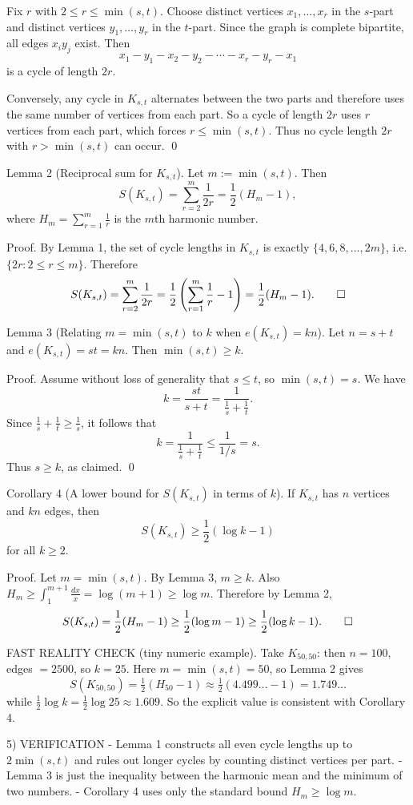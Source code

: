 Fix $r$ with $2\le r\le \min(s,t)$. Choose distinct vertices $x_1,\dots,x_r$ in the $s$-part and distinct vertices $y_1,\dots,y_r$ in the $t$-part.
Since the graph is complete bipartite, all edges $x_i y_j$ exist.
Then
\[x_1-y_1-x_2-y_2-\cdots-x_r-y_r-x_1\]
is a cycle of length $2r$.

Conversely, any cycle in $K_{s,t}$ alternates between the two parts and therefore uses the same number of vertices from each part.
So a cycle of length $2r$ uses $r$ vertices from each part, which forces $r\le \min(s,t)$.
Thus no cycle length $2r$ with $r>\min(s,t)$ can occur. \qed

Lemma 2 (Reciprocal sum for $K_{s,t}$).
Let $m:=\min(s,t)$. Then
\[S(K_{s,t})=\sum_{r=2}^{m}\frac{1}{2r}=\frac12\left(H_m-1\right),\]
where $H_m=\sum_{r=1}^m \frac1r$ is the $m$th harmonic number.

Proof.
By Lemma 1, the set of cycle lengths in $K_{s,t}$ is exactly $\{4,6,8,\dots,2m\}$, i.e. $\{2r:2\le r\le m\}$.
Therefore
\[S(K_{s,t})=\sum_{r=2}^{m}\frac{1}{2r}=\frac12\left(\sum_{r=1}^{m}\frac1r-1\right)=\frac12(H_m-1).\qed\]

Lemma 3 (Relating $m=\min(s,t)$ to $k$ when $e(K_{s,t})=kn$).
Let $n=s+t$ and $e(K_{s,t})=st=kn$. Then $\min(s,t)\ge k$.

Proof.
Assume without loss of generality that $s\le t$, so $\min(s,t)=s$.
We have
\[k=\frac{st}{s+t}=\frac{1}{\frac1s+\frac1t}.\]
Since $\frac1s+\frac1t\ge \frac1s$, it follows that
\[k=\frac{1}{\frac1s+\frac1t}\le \frac{1}{1/s}=s.\]
Thus $s\ge k$, as claimed. \qed

Corollary 4 (A lower bound for $S(K_{s,t})$ in terms of $k$).
If $K_{s,t}$ has $n$ vertices and $kn$ edges, then
\[S(K_{s,t})\ge \frac12\left(\log k - 1\right)\]
for all $k\ge 2$.

Proof.
Let $m=\min(s,t)$. By Lemma 3, $m\ge k$.
Also $H_m\ge \int_1^{m+1}\frac{dx}{x}=\log(m+1)\ge \log m$.
Therefore by Lemma 2,
\[S(K_{s,t})=\frac12(H_m-1)\ge \frac12(\log m - 1)\ge \frac12(\log k - 1).\qed\]

FAST REALITY CHECK (tiny numeric example).
Take $K_{50,50}$: then $n=100$, edges $=2500$, so $k=25$.
Here $m=\min(s,t)=50$, so Lemma 2 gives
\[S(K_{50,50})=\tfrac12(H_{50}-1)\approx \tfrac12(4.499\ldots-1)=1.749\ldots\]
while $\tfrac12\log k=\tfrac12\log 25\approx 1.609$.
So the explicit value is consistent with Corollary 4.

5) VERIFICATION
- Lemma 1 constructs all even cycle lengths up to $2\min(s,t)$ and rules out longer cycles by counting distinct vertices per part.
- Lemma 3 is just the inequality between the harmonic mean and the minimum of two numbers.
- Corollary 4 uses only the standard bound $H_m\ge \log m$.

